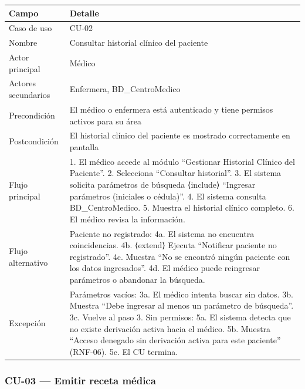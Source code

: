 \documentclass[11pt,a4paper]{article}
\begin{document}
	\begin{longtable}{p{} p{} }
		
		
		\toprule
		\textbf{Campo} &
		\textbf{Detalle}  \\
		\midrule
		\endhead
		
		Caso de uso & CU-02 \\
		Nombre & Consultar historial clínico del paciente \\
		Actor principal & Médico \\
		Actores secundarios & Enfermera, BD\_CentroMedico \\
		Precondición & El médico o enfermera está autenticado y tiene permisos activos para su área \\
		Postcondición & El historial clínico del paciente es mostrado correctamente en pantalla \\
		Flujo principal & 1. El médico accede al módulo ``Gestionar Historial Clínico del Paciente''. 2. Selecciona ``Consultar historial''. 3. El sistema solicita parámetros de búsqueda ⟨include⟩ ``Ingresar parámetros (iniciales o cédula)''. 4. El sistema consulta BD\_CentroMedico. 5. Muestra el historial clínico completo. 6. El médico revisa la información. \\
		Flujo alternativo & Paciente no registrado: 4a. El sistema no encuentra coincidencias. 4b. ⟨extend⟩ Ejecuta ``Notificar paciente no registrado''. 4c. Muestra ``No se encontró ningún paciente con los datos ingresados''. 4d. El médico puede reingresar parámetros o abandonar la búsqueda. \\
		Excepción & Parámetros vacíos: 3a. El médico intenta buscar sin datos. 3b. Muestra ``Debe ingresar al menos un parámetro de búsqueda''. 3c. Vuelve al paso 3. Sin permisos: 5a. El sistema detecta que no existe derivación activa hacia el médico. 5b. Muestra ``Acceso denegado sin derivación activa para este paciente'' (RNF-06). 5c. El CU termina. \\
		
		\bottomrule
	\end{longtable}
	
	\subsubsection{CU-03 --- Emitir receta médica}
	
\end{document}
